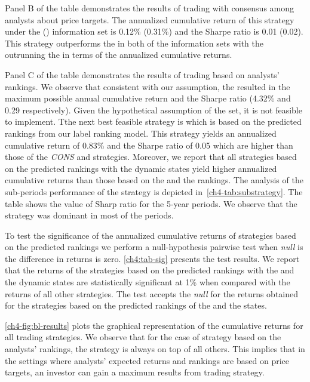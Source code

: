 \documentclass[a4paper,12pt,openright,notitlepage]{report}\usepackage[]{graphicx}\usepackage[]{color}
\begin{document}
Panel B of the table demonstrates the results of trading with consensus among analysts about price targets. The annualized cumulative return of this strategy under the \recent{} () information set is 0.12\% (0.31\%) and the Sharpe ratio is  0.01 (0.02). This strategy outperforms the \Market{} in both of the information sets with the  outrunning the \naive{} in terms of the annualized cumulative returns.

Panel C of the table demonstrates the results of trading based on analysts' rankings. We observe that consistent with our assumption, the \true{} resulted in the maximum possible annual cumulative return and the Sharpe ratio (4.32\% and  0.29 respectively). Given the hypothetical assumption of the \true{} set, it is not feasible to implement. Tthe next best feasible strategy is
\diff{}
which is based on the predicted rankings from our label ranking model. This strategy yields an annualized cumulative return of 0.83\% and the Sharpe ratio of 0.05 which are higher than those of the \textit{CONS} and \Market{} strategies. Moreover, we report that all strategies based on the predicted rankings with the dynamic states yield higher annualized cumulative returns than those  based on the  \naive{} and the  rankings. The analysis of the sub-periods performance of the \diff{} strategy is depicted in~\ref{ch4-tab:substrategy}. The table shows the value of Sharp ratio for the 5-year periods. We observe that the \diff{} strategy was dominant in most of the periods.

To test the significance of the annualized cumulative returns of strategies based on the predicted rankings we perform a null-hypothesis pairwise test when \emph{null} is the difference in returns is zero. \ref{ch4:tab-sig} presents the test results. We report that the returns of the strategies based on the predicted rankings with the \diff{} and the \random{} dynamic states are statistically significant at 1\% when compared with the returns of all other strategies. The test accepts the \emph{null} for the returns obtained for the strategies based on the predicted rankings of the \last{} and the \rollsd{} states.


\ref{ch4-fig:bl-results} plots the graphical representation of the cumulative returns for all  trading strategies. We observe that for the case of strategy based on the analysts' rankings, the \true{} strategy is always on top of all  others. This implies that in the settings where analysts' expected returns and rankings are based on price targets, an investor can gain a maximum results from trading strategy.
\end{document}
